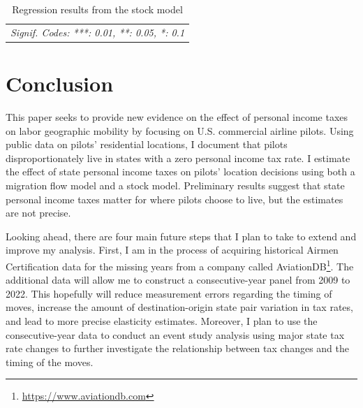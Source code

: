\documentclass[11pt]{article}
\begin{document}
\begin{table}[H]
\begin{threeparttable}[b]
\begin{tabular}{lcccccc}
			\multicolumn{7}{l}{\emph{Signif. Codes: ***: 0.01, **: 0.05, *: 0.1}}\\
		\end{tabular}
		\caption{Regression results from the stock model}
		\label{table:stock_results}
	\end{threeparttable}
\end{table}




\section{Conclusion}

This paper seeks to provide new evidence on the effect of personal income taxes on labor geographic mobility by focusing on U.S. commercial airline pilots. Using public data on pilots' residential locations, I document that pilots disproportionately live in states with a zero personal income tax rate. I estimate the effect of state personal income taxes on pilots' location decisions using both a migration flow model and a stock model. Preliminary results suggest that state personal income taxes matter for where pilots choose to live, but the estimates are not precise.

Looking ahead, there are four main future steps that I plan to take to extend and improve my analysis. First, I am in the process of acquiring historical Airmen Certification data for the missing years from a company called AviationDB\footnote{\url{https://www.aviationdb.com}}. The additional data will allow me to construct a consecutive-year panel from 2009 to 2022. This hopefully will reduce measurement errors regarding the timing of moves, increase the amount of destination-origin state pair variation in tax rates, and lead to more precise elasticity estimates. Moreover, I plan to use the consecutive-year data to conduct an event study analysis using major state tax rate changes to further investigate the relationship between tax changes and the timing of the moves.
\end{document}
